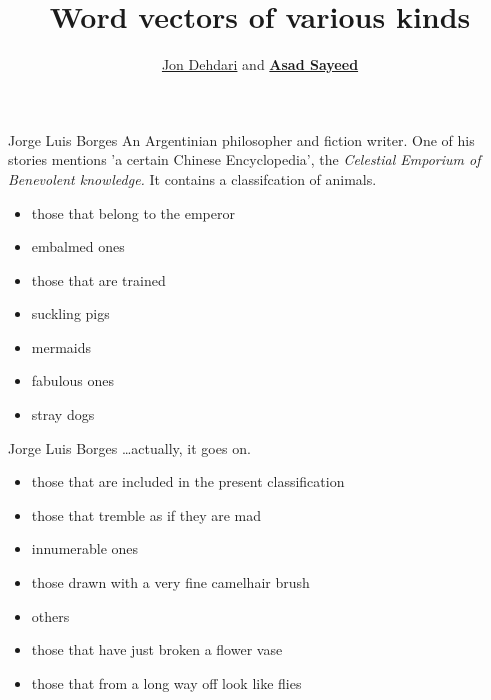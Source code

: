 \documentclass[xcolor=pdftex,x11names,table,hyperref]{beamer}
\begin{document}
\title{Word vectors of various kinds }
\author{\href{http://jon.dehdari.org}{Jon Dehdari} and \textbf{\href{http://www.coli.uni-saarland.de/~asayeed}{Asad Sayeed}}}
\frame{\titlepage}



\begin{frame}{Jorge Luis Borges}
  An Argentinian philosopher and fiction writer. One of his stories mentions
  'a certain Chinese Encyclopedia', the {\it Celestial Emporium of Benevolent knowledge.} It contains a classifcation of animals.
    \begin{itemize}
    \item those that belong to the emperor
    \item embalmed ones
    \item those that are trained
    \item suckling pigs
    \item mermaids
    \item fabulous ones
    \item stray dogs
    \end{itemize}
\end{frame}

\begin{frame}{Jorge Luis Borges}
  \ldots actually, it goes on.
    \begin{itemize}
    \item those that are included in the present classification
    \item those that tremble as if they are mad
    \item innumerable ones
    \item those drawn with a very fine camelhair brush
    \item others
    \item those that have just broken a flower vase
    \item those that from a long way off look like flies
    \end{itemize}
\end{frame}
\end{document}
